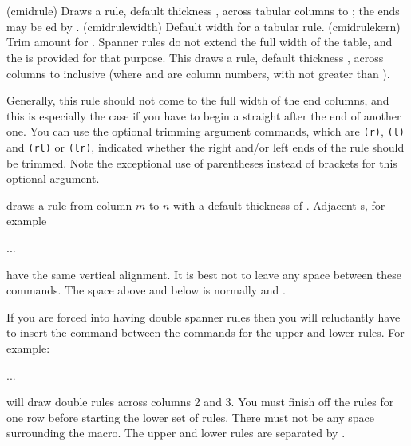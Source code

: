 \begin{syntax}
\cmd{\cmidrule} \\
\lnc{\cmidrulewidth} \lnc{\cmidrulekern} \\
\end{syntax}
\glossary(cmidrule)%
  {}%
  {Draws a rule, default thickness , across tabular
   columns  to ; the ends may be ed by
   .}
\glossary(cmidrulewidth)%
  {}%
  {Default width for a  tabular rule.}
\glossary(cmidrulekern)
  {}
  {Trim amount for .}
Spanner rules do not extend the full width of the table, and the
\cmd{\cmidrule} is provided for that purpose. This draws a rule,
default thickness \lnc{\cmidrulewidth}, across columns 
to  inclusive (where  and  are column numbers,
with  not greater than ).

 Generally, this rule
 should not come to the full width of the end columns, and this
 is especially the case if you have to begin a \cmd{\cmidrule}
 straight after the end of another one. You can use the
optional trimming argument commands, which are \verb?(r)?, \verb?(l)? and \verb?(rl)?
 or \verb?(lr)?, indicated whether the right and/or left ends of the
 rule should be trimmed. Note the exceptional use of parentheses
 instead of brackets for this optional argument.


   \cmd{\cmidrule} draws a rule from column $m$ to $n$ with a default 
thickness of \lnc{\cmidrulewidth}. Adjacent \cmd{\cmidrule}s,
for example
\begin{lcode}
... \\ 
\end{lcode}
have the same vertical alignment. It is best not to leave any space between
these commands. The space above and below
is normally \lnc{\aboverulesep} and \lnc{\belowrulesep}.

    If you are forced into having double spanner rules then you will
reluctantly have
to insert the command \cmd{\morecmidrules} between the commands for
the upper and lower rules. For example:
\begin{lcode}
... \\ \morecmidrules{}
\end{lcode}
will draw double rules across columns 2 and 3. You must finish off
the rules for one row before starting the lower set of rules. There
must not be any space surrounding the \cmd{\morecmidrules} macro.
The upper and lower rules are separated by \lnc{\cmidrulesep}.


